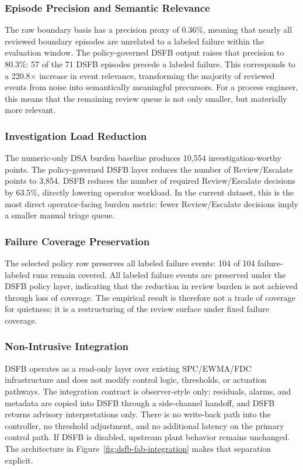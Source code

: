 \documentclass[11pt,letterpaper]{article}
\theoremstyle{scresult}
\begin{document}
\subsubsection{Episode Precision and Semantic Relevance}

The raw boundary basis has a precision proxy of 0.36\%, meaning that nearly
all reviewed boundary episodes are unrelated to a labeled failure within the
evaluation window. The policy-governed DSFB output raises that precision to
80.3\%: 57 of the 71 DSFB episodes precede a labeled failure. This corresponds
to a 220.8$\times$ increase in event relevance, transforming the majority of reviewed events from noise into
semantically meaningful precursors. For a process engineer, this means that the
remaining review queue is not only smaller, but materially more relevant.

\subsubsection{Investigation Load Reduction}

The numeric-only DSA burden baseline produces 10{,}554
investigation-worthy points. The policy-governed DSFB layer reduces the number
of Review/Escalate points to 3{,}854. DSFB reduces the number of required
Review/Escalate decisions by 63.5\%,
directly lowering operator workload. In the current dataset, this is the most
direct operator-facing burden metric: fewer Review/Escalate decisions imply a
smaller manual triage queue.

\subsubsection{Failure Coverage Preservation}

The selected policy row preserves all labeled failure events: 104 of 104
failure-labeled runs remain covered. All labeled failure events are preserved
under the DSFB policy layer, indicating that the reduction in review burden is
not achieved through loss of coverage. The empirical result is therefore not a
trade of coverage for quietness; it is a restructuring of the review surface
under fixed failure coverage.

\subsubsection{Non-Intrusive Integration}

DSFB operates as a read-only layer over existing SPC/EWMA/FDC infrastructure
and does not modify control logic, thresholds, or actuation pathways. The
integration contract is observer-style only: residuals, alarms, and metadata
are copied into DSFB through a side-channel handoff, and DSFB returns advisory
interpretations only. There is no write-back path into the controller, no
threshold adjustment, and no additional latency on the primary control path.
If DSFB is disabled, upstream plant behavior remains unchanged. The
architecture in Figure~\ref{fig:dsfb-fab-integration} makes that separation
explicit.
\end{document}
